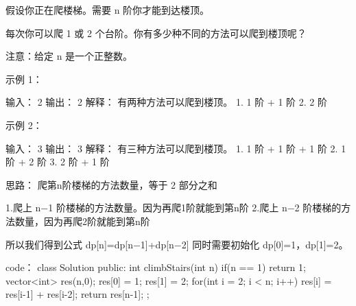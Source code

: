 假设你正在爬楼梯。需要 n 阶你才能到达楼顶。

每次你可以爬 1 或 2 个台阶。你有多少种不同的方法可以爬到楼顶呢？

注意：给定 n 是一个正整数。

示例 1：

输入： 2
输出： 2
解释： 有两种方法可以爬到楼顶。
1.  1 阶 + 1 阶
2.  2 阶

示例 2：

输入： 3
输出： 3
解释： 有三种方法可以爬到楼顶。
1.  1 阶 + 1 阶 + 1 阶
2.  1 阶 + 2 阶
3.  2 阶 + 1 阶



























思路：
爬第n阶楼梯的方法数量，等于 2 部分之和

1.爬上 n−1 阶楼梯的方法数量。因为再爬1阶就能到第n阶
2.爬上 n−2 阶楼梯的方法数量，因为再爬2阶就能到第n阶

所以我们得到公式 dp[n]=dp[n−1]+dp[n−2]
同时需要初始化 dp[0]=1，dp[1]=2。






























code：
class Solution {
public:
    int climbStairs(int n) {
        if(n == 1) return 1;
        vector<int> res(n,0);
        res[0] = 1;
        res[1] = 2;
        for(int i = 2; i < n; i++)
            res[i] = res[i-1] + res[i-2];
        return res[n-1];
    }
};